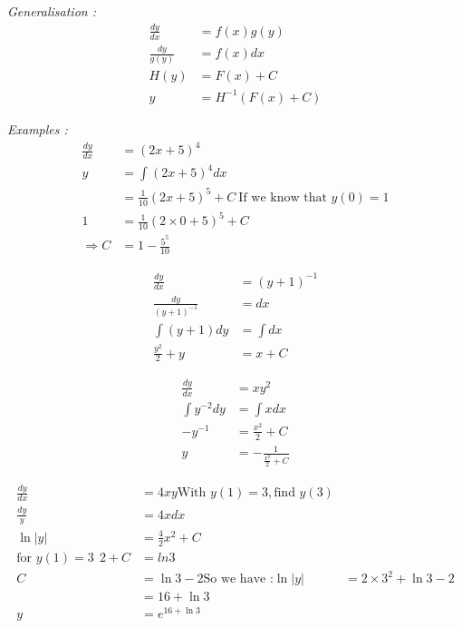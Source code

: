\documentclass{article}
\begin{document}
    \textit{Generalisation :}
    \begin{align*}
        \frac{dy}{dx} &= f(x)g(y)\\
        \frac{dy}{g(y)} &= f(x)dx\\
        H(y) &= F(x) +C \\
        y &= H^{-1}(F(x)+C)
    \end{align*}

    \textit{Examples :}
    \begin{align*}
        \frac{dy}{dx} &= (2x+5)^4\\
        y &= \int (2x+5)^4 dx\\
        &= \frac{1}{10}(2x+5)^5 +C ~ \text{If we know that }y(0)=1\\
        1 &= \frac{1}{10}(2\times 0 + 5)^5 +C \\
        \Rightarrow C &= 1-\frac{5^5}{10}
    \end{align*}

    \begin{align*}
        \frac{dy}{dx}&=(y+1)^{-1}\\
        \frac{dy}{(y+1)^{-1}} &= dx\\
        \int (y+1)dy &= \int dx\\
         \frac{y^2}{2}+y &= x + C
    \end{align*}

    \begin{align*}
        \frac{dy}{dx} &= xy^2\\
        \int y^{-2}dy &= \int xdx\\
        -y^{-1} &= \frac{x^2}{2} +C\\
        y &= - \frac{1}{\frac{x^2}{2}+C}
    \end{align*}

    \begin{align*}
        \frac{dy}{dx} &= 4xy \text{With }y(1)=3, \text{find } y(3)\\
        \frac{dy}{y} &= 4x dx\\
        \ln |y| &= \frac{4}{2}x^2 +C\\
        \text{for }y(1)=3 ~~ 2+C &= ln 3 \\
        C &= \ln 3 -2
        \text{So we have :} \ln |y| &= 2 \times 3^2 + \ln 3 -2\\
        &= 16 + \ln 3\\
        y &= e^{16 + \ln 3}
    \end{align*}
\end{document}
